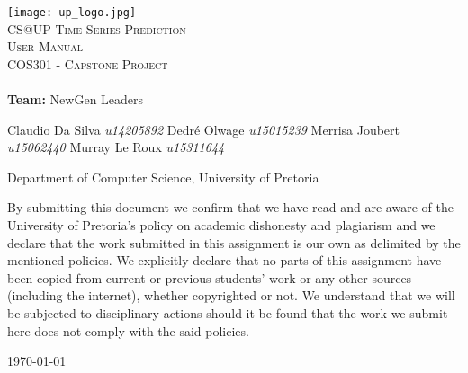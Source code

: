 \documentclass[a4paper,12pt]{article}
\begin{document}
	
	\begin{titlepage}
		\begin{center}
			
			\texttt{[image: up\_logo.jpg]}\\[2.0cm] 
			
			
			\textsc{\LARGE CS@UP Time Series Prediction}\\[1.0cm]
			
			
			\textsc{\Large User Manual}\\[0.75cm]
			
			
			\textsc{\Large COS301 - Capstone Project}\\[0.75cm]
			
			
			\textbf{\huge \\ Team:}
			\huge NewGen Leaders \\
			\begin{flushright} \large
				Claudio Da Silva		\emph{u14205892} \newline
				Dedr\'e Olwage	    	\emph{u15015239} \newline
				Merrisa Joubert			\emph{u15062440} \newline
				Murray Le Roux	    	\emph{u15311644} \newline
			\end{flushright}
			\small Department of Computer Science, University of Pretoria \\ 
			
			
		\end{center}
		
		\noindent By submitting this document we confirm that we have read and are aware of the University of Pretoria's policy on academic dishonesty and plagiarism and we declare that the work submitted in this assignment is our own as delimited by the mentioned policies. We explicitly declare that no parts of this assignment have been copied from current or previous students' work or any other sources (including the internet), whether copyrighted or not. We understand that we will be subjected to disciplinary actions should it be found that the work we submit here does not comply with the said policies.
		
		\begin{center}
			
			\vfill
			
			{\large \today}
			
		\end{center}
		
	\end{titlepage}
    
\end{document}

